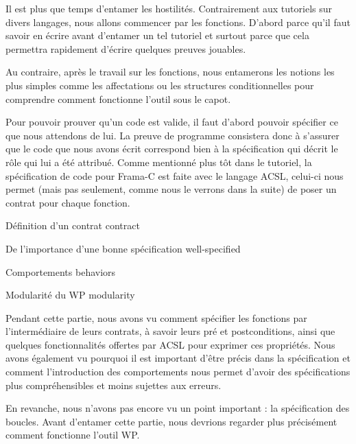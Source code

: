 
Il est plus que temps d'entamer les hostilités. Contrairement aux tutoriels 
sur divers langages, nous allons commencer par les fonctions. D'abord parce 
qu'il faut savoir en écrire avant d'entamer un tel tutoriel et surtout 
parce que cela permettra rapidement d'écrire quelques preuves jouables.



Au contraire, après le travail sur les fonctions, nous entamerons les notions 
les plus simples comme les affectations ou les structures conditionnelles pour 
comprendre comment fonctionne l'outil sous le capot.



Pour pouvoir prouver qu'un code est valide, il faut d'abord pouvoir spécifier 
ce que nous attendons de lui. La preuve de programme consistera donc à s'assurer 
que le code que nous avons écrit correspond bien à la spécification qui décrit
le rôle qui lui a été attribué. Comme mentionné plus tôt dans le tutoriel, la 
spécification de code pour Frama-C est faite avec le langage ACSL, celui-ci 
nous permet (mais pas seulement, comme nous le verrons dans la suite) de poser
un contrat pour chaque fonction.



\begin{levelTwo}
  {Définition d'un contrat}
  {contract}
\end{levelTwo}

\begin{levelTwo}
  {De l'importance d'une bonne spécification}
  {well-specified}
\end{levelTwo}

\begin{levelTwo}
  {Comportements}
  {behaviors}
\end{levelTwo}

\begin{levelTwo}
  {Modularité du WP}
  {modularity}
\end{levelTwo}

\horizontalLine
\newpage


Pendant cette partie, nous avons vu comment spécifier les fonctions par 
l'intermédiaire de leurs contrats, à savoir leurs pré et postconditions, ainsi
que quelques fonctionnalités offertes par ACSL pour exprimer ces propriétés. 
Nous avons également vu pourquoi il est important d'être précis dans la 
spécification et comment l'introduction des comportements nous permet d'avoir
des spécifications plus compréhensibles et moins sujettes aux erreurs.



En revanche, nous n'avons pas encore vu un point important : la spécification 
des boucles. Avant d'entamer cette partie, nous devrions regarder plus 
précisément comment fonctionne l'outil WP.
